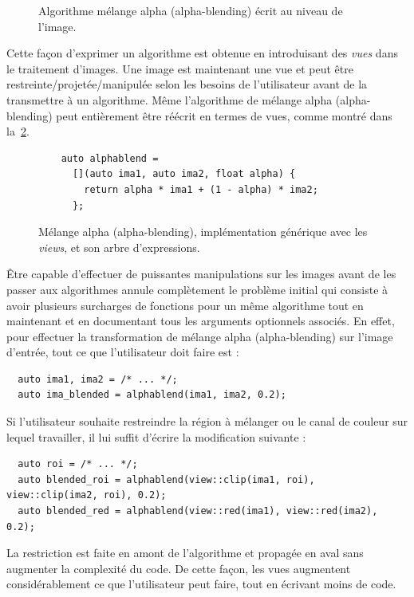 \begin{figure}[htbp]
  \centering
  

  \caption[]{Algorithme mélange alpha (alpha-blending) écrit au niveau de l'image.}
  \label{resume:fig:view.alphablend}
\end{figure}

Cette façon d'exprimer un algorithme est obtenue en introduisant des \emph{vues} dans le traitement d'images. Une image
est maintenant une vue et peut être restreinte/projetée/manipulée selon les besoins de l'utilisateur avant de la
transmettre à un algorithme. Même l'algorithme de mélange alpha (alpha-blending) peut entièrement être réécrit en termes
de vues, comme montré dans la~\cref{resume:fig:new.alphablend}.

\begin{figure}[htbp]
  \centering
  \begin{minipage}[b]{5.5cm}
    
  \end{minipage}
  \begin{minipage}[b]{5.5cm}
    \begin{verbatim}
    auto alphablend =
      [](auto ima1, auto ima2, float alpha) {
        return alpha * ima1 + (1 - alpha) * ima2;
      };
    \end{verbatim}
    \bigskip
    \bigskip
    \bigskip
  \end{minipage}
  \caption[]{Mélange alpha (alpha-blending), implémentation générique avec les \emph{views}, et son arbre
    d'expressions.}
  \label{resume:fig:new.alphablend}
\end{figure}

Être capable d'effectuer de puissantes manipulations sur les images avant de les passer aux algorithmes annule
complètement le problème initial qui consiste à avoir plusieurs surcharges de fonctions pour un même algorithme tout en
maintenant et en documentant tous les arguments optionnels associés. En effet, pour effectuer la transformation de
mélange alpha (alpha-blending) sur l'image d'entrée, tout ce que l'utilisateur doit faire est :
\begin{verbatim}
  auto ima1, ima2 = /* ... */;
  auto ima_blended = alphablend(ima1, ima2, 0.2);
\end{verbatim}
Si l'utilisateur souhaite restreindre la région à mélanger ou le canal de couleur sur lequel travailler, il lui suffit
d'écrire la modification suivante :
\begin{verbatim}
  auto roi = /* ... */;
  auto blended_roi = alphablend(view::clip(ima1, roi), view::clip(ima2, roi), 0.2);
  auto blended_red = alphablend(view::red(ima1), view::red(ima2), 0.2);
\end{verbatim}
La restriction est faite en amont de l'algorithme et propagée en aval sans augmenter la complexité du code. De cette
façon, les vues augmentent considérablement ce que l'utilisateur peut faire, tout en écrivant moins de code.

